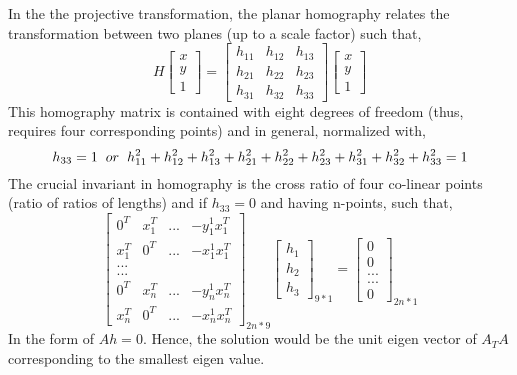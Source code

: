 \documentclass[11pt]{scrartcl}
\begin{document}
{In the the projective transformation, the planar homography relates the transformation between two planes (up to a scale factor) such that,
\begin{equation}
H 
\begin{bmatrix}
x\\
y\\
1
\end{bmatrix} =
\begin{bmatrix}
h_{11} & h_{12} & h_{13}\\
h_{21} & h_{22} & h_{23}\\
h_{31} & h_{32} & h_{33}
\end{bmatrix}
\begin{bmatrix}
x\\
y\\
1
\end{bmatrix}
\end{equation}
This homography matrix is contained with eight degrees of freedom (thus, requires four corresponding points) and in general, normalized with,
\begin{equation}
    h_{33}=1 \hspace{2mm} or \hspace{2mm} h^2_{11}+h^2_{12}+h^2_{13}+h^2_{21}+h^2_{22}+h^2_{23}+h^2_{31}+h^2_{32}+h^2_{33}=1
\end{equation}
The crucial invariant in homography is the cross ratio of four co-linear points (ratio of ratios of lengths) and if $h_{33}=0$ and having n-points, such that,
\begin{equation}
    \begin{bmatrix}
    \textbf{$0^T$} & \textbf{$x^T_1$} & ... & \textbf{$-y^1_1x^T_1$}\\
    \textbf{$x^T_1$} & \textbf{$0^T$} & ... & \textbf{$-x^1_1x^T_1$}\\
        ...
    \\
    ...\\
    \textbf{$0^T$} & \textbf{$x^T_n$} & ... & \textbf{$-y^1_nx^T_n$}\\
    \textbf{$x^T_n$} & \textbf{$0^T$} & ... & \textbf{$-x^1_nx^T_n$}
    \end{bmatrix}_{2n*9}\begin{bmatrix}
    h_1\\h_2\\h_3
    \end{bmatrix}_{9*1}=
    \begin{bmatrix}
    0\\0\\...\\...\\0
    \end{bmatrix}_{2n*1}
\end{equation}
In the form of $Ah=0$. Hence, the solution would be the unit eigen vector of $A_TA$ corresponding to the smallest eigen value.

}
\end{document}
